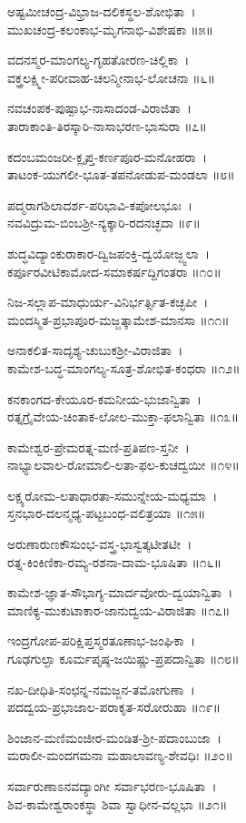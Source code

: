 ಅಷ್ಟಮೀಚಂದ್ರ-ವಿಭ್ರಾಜ-ದಲಿಕಸ್ಥಲ-ಶೋಭಿತಾ~।\\
ಮುಖಚಂದ್ರ-ಕಲಂಕಾಭ-ಮೃಗನಾಭಿ-ವಿಶೇಷಕಾ ॥೫॥

ವದನಸ್ಮರ-ಮಾಂಗಲ್ಯ-ಗೃಹತೋರಣ-ಚಿಲ್ಲಿಕಾ~।\\
ವಕ್ತ್ರಲಕ್ಷ್ಮೀ-ಪರೀವಾಹ-ಚಲನ್ಮೀನಾಭ-ಲೋಚನಾ ॥೬॥

ನವಚಂಪಕ-ಪುಷ್ಪಾಭ-ನಾಸಾದಂಡ-ವಿರಾಜಿತಾ~।\\
ತಾರಾಕಾಂತಿ-ತಿರಸ್ಕಾರಿ-ನಾಸಾಭರಣ-ಭಾಸುರಾ ॥೭॥

ಕದಂಬಮಂಜರೀ-ಕ್ಲೃಪ್ತ-ಕರ್ಣಪೂರ-ಮನೋಹರಾ~।\\
ತಾಟಂಕ-ಯುಗಲೀ-ಭೂತ-ತಪನೋಡುಪ-ಮಂಡಲಾ ॥೮॥

ಪದ್ಮರಾಗಶಿಲಾದರ್ಶ-ಪರಿಭಾವಿ-ಕಪೋಲಭೂಃ~।\\
ನವವಿದ್ರುಮ-ಬಿಂಬಶ್ರೀ-ನ್ಯಕ್ಕಾರಿ-ರದನಚ್ಛದಾ ॥೯॥

ಶುದ್ಧವಿದ್ಯಾಂಕುರಾಕಾರ-ದ್ವಿಜಪಂಕ್ತಿ-ದ್ವಯೋಜ್ಜ್ವಲಾ~।\\
ಕರ್ಪೂರವೀಟಿಕಾಮೋದ-ಸಮಾಕರ್ಷದ್ದಿಗಂತರಾ ॥೧೦॥

ನಿಜ-ಸಲ್ಲಾಪ-ಮಾಧುರ್ಯ-ವಿನಿರ್ಭರ್ತ್ಸಿತ-ಕಚ್ಛಪೀ~।\\
ಮಂದಸ್ಮಿತ-ಪ್ರಭಾಪೂರ-ಮಜ್ಜತ್ಕಾಮೇಶ-ಮಾನಸಾ ॥೧೧॥

ಅನಾಕಲಿತ-ಸಾದೃಶ್ಯ-ಚುಬುಕಶ್ರೀ-ವಿರಾಜಿತಾ~।\\
ಕಾಮೇಶ-ಬದ್ಧ-ಮಾಂಗಲ್ಯ-ಸೂತ್ರ-ಶೋಭಿತ-ಕಂಧರಾ ॥೧೨॥

ಕನಕಾಂಗದ-ಕೇಯೂರ-ಕಮನೀಯ-ಭುಜಾನ್ವಿತಾ~।\\
ರತ್ನಗ್ರೈವೇಯ-ಚಿಂತಾಕ-ಲೋಲ-ಮುಕ್ತಾ-ಫಲಾನ್ವಿತಾ ॥೧೩॥

ಕಾಮೇಶ್ವರ-ಪ್ರೇಮರತ್ನ-ಮಣಿ-ಪ್ರತಿಪಣ-ಸ್ತನೀ~।\\
ನಾಭ್ಯಾಲವಾಲ-ರೋಮಾಲಿ-ಲತಾ-ಫಲ-ಕುಚದ್ವಯೀ ॥೧೪॥

ಲಕ್ಷ್ಯರೋಮ-ಲತಾಧಾರತಾ-ಸಮುನ್ನೇಯ-ಮಧ್ಯಮಾ~।\\
ಸ್ತನಭಾರ-ದಲನ್ಮಧ್ಯ-ಪಟ್ಟಬಂಧ-ವಲಿತ್ರಯಾ ॥೧೫॥

ಅರುಣಾರುಣಕೌಸುಂಭ-ವಸ್ತ್ರ-ಭಾಸ್ವತ್ಕಟೀತಟೀ~।\\
ರತ್ನ-ಕಿಂಕಿಣಿಕಾ-ರಮ್ಯ-ರಶನಾ-ದಾಮ-ಭೂಷಿತಾ ॥೧೬॥

ಕಾಮೇಶ-ಜ್ಞಾತ-ಸೌಭಾಗ್ಯ-ಮಾರ್ದವೋರು-ದ್ವಯಾನ್ವಿತಾ~।\\
ಮಾಣಿಕ್ಯ-ಮುಕುಟಾಕಾರ-ಜಾನುದ್ವಯ-ವಿರಾಜಿತಾ ॥೧೭॥

ಇಂದ್ರಗೋಪ-ಪರಿಕ್ಷಿಪ್ತಸ್ಮರತೂಣಾಭ-ಜಂಘಿಕಾ~।\\
ಗೂಢಗುಲ್ಫಾ ಕೂರ್ಮಪೃಷ್ಠ-ಜಯಿಷ್ಣು-ಪ್ರಪದಾನ್ವಿತಾ ॥೧೮॥

ನಖ-ದೀಧಿತಿ-ಸಂಛನ್ನ-ನಮಜ್ಜನ-ತಮೋಗುಣಾ~।\\
ಪದದ್ವಯ-ಪ್ರಭಾಜಾಲ-ಪರಾಕೃತ-ಸರೋರುಹಾ ॥೧೯॥

ಶಿಂಜಾನ-ಮಣಿಮಂಜೀರ-ಮಂಡಿತ-ಶ್ರೀ-ಪದಾಂಬುಜಾ~।\\
ಮರಾಲೀ-ಮಂದಗಮನಾ ಮಹಾಲಾವಣ್ಯ-ಶೇವಧಿಃ ॥೨೦॥

ಸರ್ವಾರುಣಾಽನವದ್ಯಾಂಗೀ ಸರ್ವಾಭರಣ-ಭೂಷಿತಾ~।\\
ಶಿವ-ಕಾಮೇಶ್ವರಾಂಕಸ್ಥಾ ಶಿವಾ ಸ್ವಾಧೀನ-ವಲ್ಲಭಾ ॥೨೧॥


